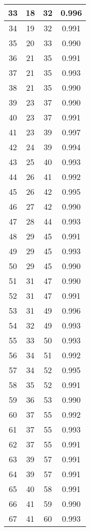 \begin{table}
\begin{tabular}{|c|c|c|c|}
 33  & 18  & 32 & 0.996  \\ \hline
 34  & 19  & 32 & 0.991  \\ \hline
 35  & 20  & 33 & 0.990  \\ \hline
 36  & 21  & 35 & 0.991  \\ \hline
 37  & 21  & 35 & 0.993  \\ \hline
 38  & 21  & 35 & 0.990  \\ \hline
 39  & 23  & 37 & 0.990  \\ \hline
 40  & 23  & 37 & 0.991  \\ \hline
 41  & 23  & 39 & 0.997  \\ \hline
 42  & 24  & 39 & 0.994  \\ \hline
 43  & 25  & 40 & 0.993  \\ \hline
 44  & 26  & 41 & 0.992  \\ \hline
 45  & 26  & 42 & 0.995  \\ \hline
 46  & 27  & 42 & 0.990  \\ \hline
 47  & 28  & 44 & 0.993  \\ \hline
 48  & 29  & 45 & 0.991  \\ \hline
 49  & 29  & 45 & 0.993  \\ \hline
 50  & 29  & 45 & 0.990  \\ \hline
 51  & 31  & 47 & 0.990  \\ \hline
 52  & 31  & 47 & 0.991  \\ \hline
 53  & 31  & 49 & 0.996  \\ \hline
 54  & 32  & 49 & 0.993  \\ \hline
 55  & 33  & 50 & 0.993  \\ \hline
 56  & 34  & 51 & 0.992  \\ \hline
 57  & 34  & 52 & 0.995  \\ \hline
 58  & 35  & 52 & 0.991  \\ \hline
 59  & 36  & 53 & 0.990  \\ \hline
 60  & 37  & 55 & 0.992  \\ \hline
 61  & 37  & 55 & 0.993  \\ \hline
 62  & 37  & 55 & 0.991  \\ \hline
 63  & 39  & 57 & 0.991  \\ \hline
 64  & 39  & 57 & 0.991  \\ \hline
 65  & 40  & 58 & 0.991  \\ \hline
 66  & 41  & 59 & 0.990  \\ \hline
 67  & 41  & 60 & 0.993  \\ \hline

\end{tabular}
\end{table}
